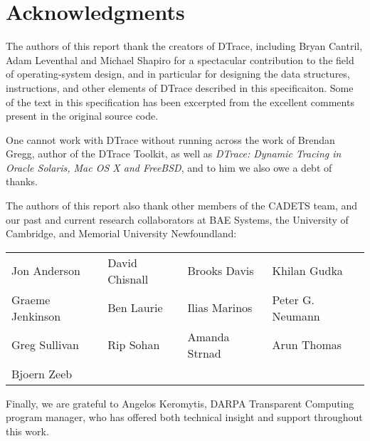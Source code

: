 \section*{Acknowledgments}
The authors of this report thank the creators of DTrace, including
Bryan Cantril, Adam Leventhal and Michael Shapiro for a spectacular
contribution to the field of operating-system design, and in
particular for designing the data structures, instructions, and other
elements of DTrace described in this specificaiton.  Some of the text
in this specification has been excerpted from the excellent comments
present in the original source code.

One cannot work with DTrace without running across the work of Brendan
Gregg, author of the DTrace Toolkit, as well as \emph{DTrace: Dynamic
  Tracing in Oracle Solaris, Mac OS X and FreeBSD}, and to him we also
owe a debt of thanks.

The authors of this report also thank other members of the CADETS team, and
our past and current research collaborators at BAE Systems, the University of
Cambridge, and Memorial University Newfoundland:

%
%
\begin{tabular}{llll}
Jon Anderson & David Chisnall & Brooks Davis & Khilan Gudka \\
Graeme Jenkinson & Ben Laurie & Ilias Marinos & Peter G. Neumann \\
Greg Sullivan & Rip Sohan & Amanda Strnad & Arun Thomas \\
Bjoern Zeeb
\end{tabular}

\bigskip

%
%
%

\noindent
Finally, we are grateful to Angelos Keromytis, DARPA Transparent Computing
program manager, who has offered both technical insight and support throughout
this work.
